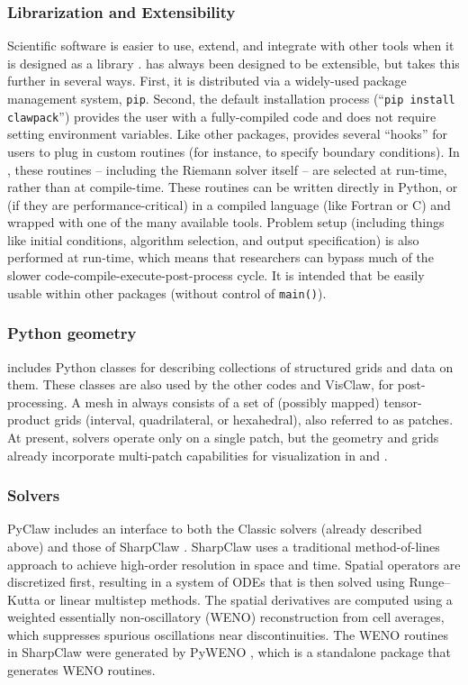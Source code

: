 \subsubsection{Librarization and Extensibility}
Scientific software is easier to use, extend, and integrate with other tools
when it is designed as a library \cite{Brown:2015cj}.  \clawpack has always been
designed to be extensible, but \pyclaw takes this further in several ways.
First, it is distributed via a widely-used package management system,
\texttt{pip}. Second, the default installation process (``\texttt{pip install
clawpack}'') provides the user with a fully-compiled code and does not require
setting environment variables.  Like other \clawpack packages, \pyclaw provides
several ``hooks'' for users to plug in custom routines (for instance, to specify
boundary conditions). In \pyclaw, these routines -- including the Riemann solver
itself -- are selected at run-time, rather than at compile-time.  These routines
can be written directly in Python, or (if they are performance-critical) in a
compiled language (like Fortran or C) and wrapped with one of the many available
tools.  Problem setup (including things like initial conditions, algorithm
selection, and output specification) is also performed at run-time, which means
that researchers can bypass much of the slower code-compile-execute-post-process
cycle. It is intended that \pyclaw be easily usable within other packages
(without control of \texttt{main()}).  

\subsubsection{Python geometry}
\pyclaw includes Python classes for describing collections of structured grids
and data on them. These classes are also used by the other codes and
VisClaw, for post-processing.  A mesh in \clawpack always consists of a set of
(possibly mapped) tensor-product
grids (interval, quadrilateral, or hexahedral), also referred to as patches.
At present, \pyclaw solvers operate only on a single patch, but the
geometry and grids already incorporate multi-patch
capabilities for visualization in \amrclaw and \geoclaw.

\subsubsection{\pyclaw Solvers} 

PyClaw includes an interface to both the Classic solvers (already
described above) and those of SharpClaw \cite{ketcheson2012pyclaw}.
SharpClaw uses a traditional method-of-lines approach to achieve
high-order resolution in space and time.  Spatial operators are
discretized first, resulting in a system of ODEs that is then solved
using Runge--Kutta or linear multistep methods.  The spatial
derivatives are computed using a weighted essentially non-oscillatory
(WENO) reconstruction from cell averages, which suppresses spurious
oscillations near discontinuities.  The WENO routines in SharpClaw
were generated by PyWENO \cite{pyweno}, which is a standalone package
that generates WENO routines.

